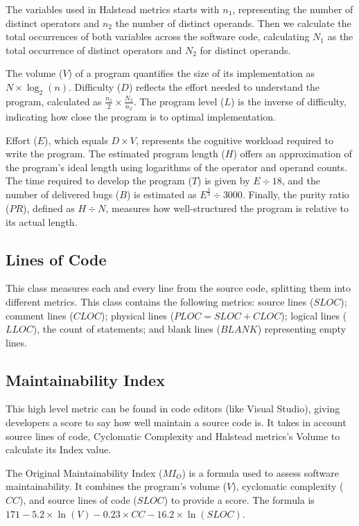 The variables used in Halstead metrics starts with $n_{1}$, representing the number of distinct operators and $n_{2}$ the
number of distinct operands. Then we calculate the total occurrences of both variables across the software code, calculating
$N_{1}$ as the total occurrence of distinct operators and $N_{2}$ for distinct operands.

The volume (\(V\)) of a program quantifies the size of its implementation as \(N \times \log_2(n)\). Difficulty (\(D\)) reflects the effort needed to understand the program, calculated as \(\frac{n_1}{2} \times \frac{N_2}{n_2}\). The program level (\(L\)) is the inverse of difficulty, indicating how close the program is to optimal implementation.

Effort (\(E\)), which equals \(D \times V\), represents the cognitive workload required to write the program. The estimated program length (\(H\)) offers an approximation of the program's ideal length using logarithms of the operator and operand counts. The time required to develop the program (\(T\)) is given by \(E \div 18\), and the number of delivered bugs (\(B\)) is estimated as \(E^{\frac{2}{3}} \div 3000\). Finally, the purity ratio (\(PR\)), defined as \(H \div N\), measures how well-structured the program is relative to its actual length.

\subsection{Lines of Code}

This class measures each and every line from the source code, splitting them into different metrics.
This class contains the following metrics: source lines ($SLOC$); comment lines ($CLOC$); physical lines ($PLOC = SLOC + CLOC$);
logical lines ($LLOC$), the count of statements; and blank lines ($BLANK$) representing empty lines.

\subsection{Maintainability Index}

This high level metric can be found in code editors (like Visual Studio), giving developers a score to say how well maintain
a source code is. It takes in account source lines of code, Cyclomatic Complexity and Halstead metrics's Volume to calculate its Index value.

The Original Maintainability Index (\(MI_O\)) is a formula used to assess software maintainability.
It combines the program's volume (\(V\)), cyclomatic complexity (\(CC\)), and source lines of code (\(SLOC\)) to provide a score.
The formula is \(171 - 5.2 \times \ln(V) - 0.23 \times CC - 16.2 \times \ln(SLOC)\).

